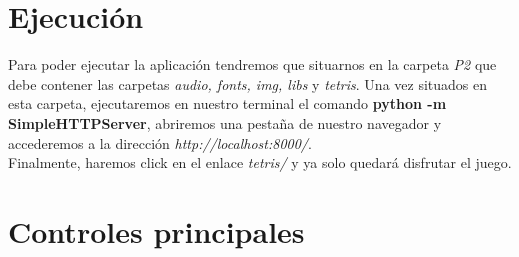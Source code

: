 \documentclass[11pt,a4paper]{article}
\begin{document}
\section{Ejecución}

Para poder ejecutar la aplicación tendremos que situarnos en la carpeta \textit{P2} que debe contener las carpetas \textit{audio, fonts, img, libs} y \textit{tetris}. Una vez situados en esta carpeta, ejecutaremos en nuestro terminal el comando \textbf{python -m SimpleHTTPServer}, abriremos una pestaña de nuestro navegador y accederemos a la dirección \textit{http://localhost:8000/}.\\

Finalmente, haremos click en el enlace \textit{tetris/} y ya solo quedará disfrutar el juego.

\section{Controles principales}
\end{document}
